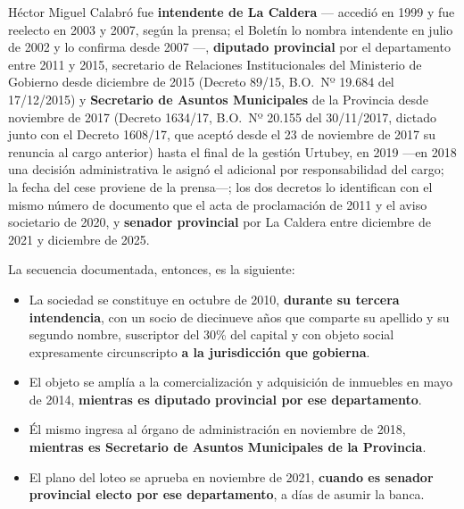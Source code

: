 Héctor Miguel Calabró fue \textbf{intendente de La Caldera} --- accedió en 1999 y fue reelecto en 2003 y 2007, según la prensa; el Boletín lo nombra intendente en julio de 2002 y lo confirma desde 2007 ---, \textbf{diputado provincial} por el departamento entre 2011 y 2015, secretario de Relaciones Institucionales del Ministerio de Gobierno desde diciembre de 2015 (Decreto 89/15, B.O.\ Nº 19.684 del 17/12/2015) y \textbf{Secretario de Asuntos Municipales} de la Provincia desde noviembre de 2017 (Decreto 1634/17, B.O.\ Nº 20.155 del 30/11/2017, dictado junto con el Decreto 1608/17, que aceptó desde el 23 de noviembre de 2017 su renuncia al cargo anterior) hasta el final de la gestión Urtubey, en 2019 ---en 2018 una decisión administrativa le asignó el adicional por responsabilidad del cargo; la fecha del cese proviene de la prensa---; los dos decretos lo identifican con el mismo número de documento que el acta de proclamación de 2011 y el aviso societario de 2020, y \textbf{senador provincial} por La Caldera entre diciembre de 2021 y diciembre de 2025.

La secuencia documentada, entonces, es la siguiente:

\begin{itemize}[leftmargin=1cm,itemsep=2pt]
\item La sociedad se constituye en octubre de 2010, \textbf{durante su tercera intendencia}, con un socio de diecinueve años que comparte su apellido y su segundo nombre, suscriptor del 30\% del capital y con objeto social expresamente circunscripto \textbf{a la jurisdicción que gobierna}.
\item El objeto se amplía a la comercialización y adquisición de inmuebles en mayo de 2014, \textbf{mientras es diputado provincial por ese departamento}.
\item Él mismo ingresa al órgano de administración en noviembre de 2018, \textbf{mientras es Secretario de Asuntos Municipales de la Provincia}.
\item El plano del loteo se aprueba en noviembre de 2021, \textbf{cuando es senador provincial electo por ese departamento}, a días de asumir la banca.
\end{itemize}

